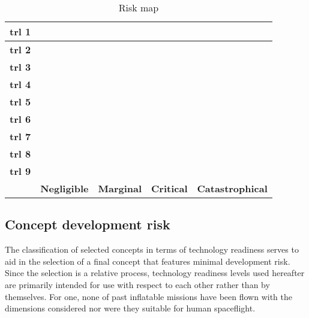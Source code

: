 \begin{table}[H]
	\centering
	\caption{Risk map}
	\label{tab:riskmap}
	\begin{tabular}{|c|c|c|c|c|} %
		\hline
		\textbf{\gls{trl} 1} & \cellcolor{green} & \cellcolor{yellow} & \cellcolor{red} & \cellcolor{red} \\ \hline
		\textbf{\gls{trl} 2} & \cellcolor{green} & \cellcolor{yellow} & \cellcolor{red} & \cellcolor{red} \\ \hline
		\textbf{\gls{trl} 3} & \cellcolor{green} & \cellcolor{yellow} & \cellcolor{red} & \cellcolor{red} \\ \hline
		\textbf{\gls{trl} 4} & \cellcolor{green} & \cellcolor{yellow} & \cellcolor{yellow} & \cellcolor{yellow} \\ \hline
		\textbf{\gls{trl} 5} & \cellcolor{green} & \cellcolor{green} & \cellcolor{yellow} & \cellcolor{yellow} \\ \hline
		\textbf{\gls{trl} 6} & \cellcolor{green} & \cellcolor{green} & \cellcolor{green} & \cellcolor{green} \\ \hline
		\textbf{\gls{trl} 7} & \cellcolor{green} & \cellcolor{green} & \cellcolor{green} & \cellcolor{green} \\ \hline
		\textbf{\gls{trl} 8} & \cellcolor{green} & \cellcolor{green} & \cellcolor{green} & \cellcolor{green} \\ \hline
		\textbf{\gls{trl} 9} & \cellcolor{green} & \cellcolor{green} & \cellcolor{green} & \cellcolor{green} \\ \hline
		 & \textbf{Negligible} & \textbf{Marginal} & \textbf{Critical} & \textbf{Catastrophical} \\ \hline
	\end{tabular}
\end{table}

\subsection{Concept development risk}

The classification of selected concepts in terms of technology readiness serves to aid in the selection of a final concept that features minimal development risk. Since the selection is a relative process, technology readiness levels used hereafter are primarily intended for use with respect to each other rather than by themselves. For one, none of past inflatable missions have been flown with the dimensions considered nor were they suitable for human spaceflight.

